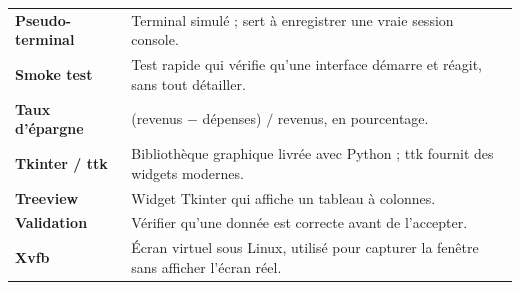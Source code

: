 \documentclass[11pt,a4paper]{article}
\begin{document}
\begin{longtable}{@{}>{\raggedright\bfseries}p{3.6cm}>{\raggedright\arraybackslash}p{11.6cm}@{}}
Pseudo-terminal & Terminal simulé ; sert à enregistrer une vraie session console. \\
Smoke test & Test rapide qui vérifie qu'une interface démarre et réagit, sans tout détailler. \\
Taux d'épargne & (revenus $-$ dépenses) $/$ revenus, en pourcentage. \\
Tkinter / ttk & Bibliothèque graphique livrée avec Python ; ttk fournit des widgets modernes. \\
Treeview & Widget Tkinter qui affiche un tableau à colonnes. \\
Validation & Vérifier qu'une donnée est correcte avant de l'accepter. \\
Xvfb & Écran virtuel sous Linux, utilisé pour capturer la fenêtre sans afficher l'écran réel. \\
\bottomrule
\end{longtable}
\end{document}
